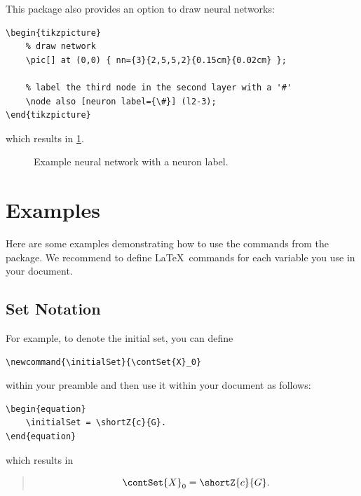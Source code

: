 \documentclass{article}
\begin{document}
This package also provides an option to draw neural networks:
\begin{verbatim}
\begin{tikzpicture}
    % draw network
    \pic[] at (0,0) { nn={3}{2,5,5,2}{0.15cm}{0.02cm} };

    % label the third node in the second layer with a '#'
    \node also [neuron label={\#}] (l2-3);
\end{tikzpicture}
\end{verbatim}
which results in \cref{fig:neural-network}.

\begin{figure}[h!]
  \centering
  \caption{Example neural network with a neuron label.}
  \label{fig:neural-network}
\end{figure}

\section{Examples}
Here are some examples demonstrating how to use the commands from the \texttt{\CORAMACSname} package.
We recommend to define \LaTeX\ commands for each variable you use in your document.

\subsection{Set Notation}
For example, to denote the initial set, you can define
\newcommand{\initialSet}{\contSet{X}_0}
\begin{verbatim}
\newcommand{\initialSet}{\contSet{X}_0}
\end{verbatim}
within your preamble and then use it within your document as follows:
\begin{verbatim}
\begin{equation}
    \initialSet = \shortZ{c}{G}.
\end{equation}
\end{verbatim}
which results in
\begin{quote}
  \begin{equation}
    \initialSet = \shortZ{c}{G}.
  \end{equation}
\end{quote}
\end{document}
